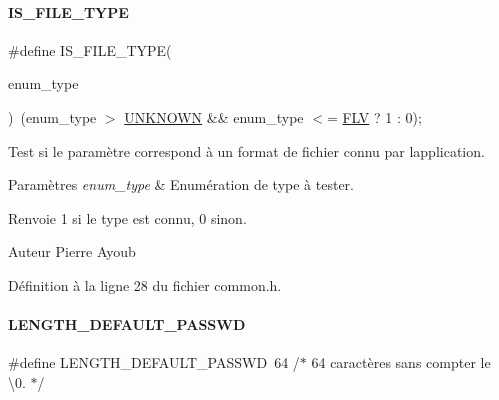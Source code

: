 \paragraph{\texorpdfstring{I\+S\+\_\+\+F\+I\+L\+E\+\_\+\+T\+Y\+PE}{IS\_FILE\_TYPE}}
{\footnotesize\ttfamily \#define I\+S\+\_\+\+F\+I\+L\+E\+\_\+\+T\+Y\+PE(\begin{DoxyParamCaption}\item[{}]{enum\+\_\+type }\end{DoxyParamCaption})~(enum\+\_\+type $>$ \hyperlink{a00047_a7aead736a07eaf25623ad7bfa1f0ee2da6ce26a62afab55d7606ad4e92428b30c}{U\+N\+K\+N\+O\+WN} \&\& enum\+\_\+type $<$= \hyperlink{a00047_a7aead736a07eaf25623ad7bfa1f0ee2da3648fb67ff3ff0f5baefbff1eb09b651}{F\+LV} ? 1 \+: 0);}



Test si le paramètre correspond à un format de fichier connu par l\textquotesingle{}application. 


\begin{DoxyParams}{Paramètres}
{\em enum\+\_\+type} & Enumération de type à tester. \\
\hline
\end{DoxyParams}
\begin{DoxyReturn}{Renvoie}
1 si le type est connu, 0 sinon. 
\end{DoxyReturn}
\begin{DoxyAuthor}{Auteur}
Pierre Ayoub 
\end{DoxyAuthor}


Définition à la ligne 28 du fichier common.\+h.

\mbox{\label{a00047_a24c0fa06fa7cc4e918a9d217b1e62657}} 
\paragraph{\texorpdfstring{L\+E\+N\+G\+T\+H\+\_\+\+D\+E\+F\+A\+U\+L\+T\+\_\+\+P\+A\+S\+S\+WD}{LENGTH\_DEFAULT\_PASSWD}}
{\footnotesize\ttfamily \#define L\+E\+N\+G\+T\+H\+\_\+\+D\+E\+F\+A\+U\+L\+T\+\_\+\+P\+A\+S\+S\+WD~64       /$\ast$ 64 caractères sans compter le \textquotesingle{}\textbackslash{}0\textquotesingle{}. $\ast$/}

